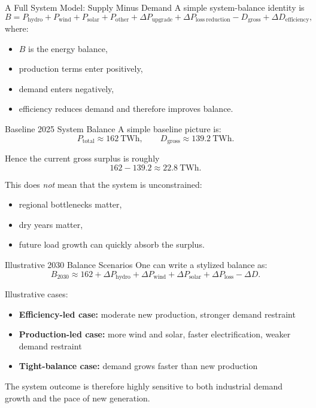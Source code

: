 \documentclass[aspectratio=169]{beamer}
\begin{document}
\begin{frame}{A Full System Model: Supply Minus Demand}
A simple system-balance identity is
\[
B = P_{\mathrm{hydro}} + P_{\mathrm{wind}} + P_{\mathrm{solar}} + P_{\mathrm{other}}
+ \Delta P_{\mathrm{upgrade}}
+ \Delta P_{\mathrm{loss\ reduction}}
- D_{\mathrm{gross}}
+ \Delta D_{\mathrm{efficiency}},
\]
where:
\begin{itemize}
    \item \(B\) is the energy balance,
    \item production terms enter positively,
    \item demand enters negatively,
    \item efficiency reduces demand and therefore improves balance.
\end{itemize}
\end{frame}

\begin{frame}{Baseline 2025 System Balance}
A simple baseline picture is:
\[
P_{\mathrm{total}} \approx 162\ \text{TWh},
\qquad
D_{\mathrm{gross}} \approx 139.2\ \text{TWh}.
\]

Hence the current gross surplus is roughly
\[
162 - 139.2 \approx 22.8\ \text{TWh}.
\]

\medskip

This does \emph{not} mean that the system is unconstrained:
\begin{itemize}
    \item regional bottlenecks matter,
    \item dry years matter,
    \item future load growth can quickly absorb the surplus.
\end{itemize}
\end{frame}

\begin{frame}{Illustrative 2030 Balance Scenarios}
One can write a stylized balance as:
\[
B_{2030} \approx 162 + \Delta P_{\mathrm{hydro}} + \Delta P_{\mathrm{wind}} + \Delta P_{\mathrm{solar}} + \Delta P_{\mathrm{loss}} - \Delta D.
\]

Illustrative cases:
\begin{itemize}
    \item \textbf{Efficiency-led case:} moderate new production, stronger demand restraint
    \item \textbf{Production-led case:} more wind and solar, faster electrification, weaker demand restraint
    \item \textbf{Tight-balance case:} demand grows faster than new production
\end{itemize}

The system outcome is therefore highly sensitive to both industrial demand growth and the pace of new generation.
\end{frame}
\end{document}
